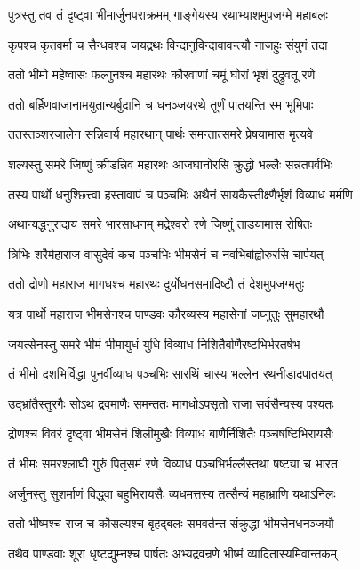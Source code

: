 \twolineshloka
{पुत्रस्तु तव तं दृष्ट्वा भीमार्जुनपराक्रमम्}
{गाङ्गेयस्य रथाभ्याशमुपजग्मे महाबलः}


\twolineshloka
{कृपश्च कृतवर्मा च सैन्धवश्च जयद्रथः}
{विन्दानुविन्दावावन्त्यौ नाजहुः संयुगं तदा}


\twolineshloka
{ततो भीमो महेष्वासः फल्गुनश्च महारथः}
{कौरवाणां चमूं घोरां भृशं दुद्रुवतू रणे}


\twolineshloka
{ततो बर्हिणवाजानामयुतान्यर्बुदानि च}
{धनञ्जयरथे तूर्णं पातयन्ति स्म भूमिपाः}


\twolineshloka
{ततस्तञ्शरजालेन सन्निवार्य महारथान्}
{पार्थः समन्तात्समरे प्रेषयामास मृत्यवे}


\twolineshloka
{शल्यस्तु समरे जिष्णुं क्रीडन्निव महारथः}
{आजघानोरसि क्रुद्धो भल्लैः सन्नतपर्वभिः}


\twolineshloka
{तस्य पार्थो धनुश्छित्त्वा हस्तावापं च पञ्चभिः}
{अथैनं सायकैस्तीक्ष्णैर्भृशं विव्याध मर्मणि}


\twolineshloka
{अथान्यद्धनुरादाय समरे भारसाधनम्}
{मद्रेश्वरो रणे जिष्णुं ताडयामास रोषितः}


\twolineshloka
{त्रिभिः शरैर्महाराज वासुदेवं कच पञ्चभिः}
{भीमसेनं च नवभिर्बाह्वोरुरसि चार्पयत्}


\twolineshloka
{ततो द्रोणो महाराज मागधश्च महारथः}
{दुर्योधनसमादिष्टौ तं देशमुपजग्मतुः}


\twolineshloka
{यत्र पार्थो महाराज भीमसेनश्च पाण्डवः}
{कौरव्यस्य महासेनां जघ्नुतुः सुमहारथौ}


\twolineshloka
{जयत्सेनस्तु समरे भीमं भीमायुधं युधि}
{विव्याध निशितैर्बाणैरष्टभिर्भरतर्षभ}


\twolineshloka
{तं भीमो दशभिर्विद्धा पुनर्वीव्याध पञ्चभिः}
{सारथिं चास्य भल्लेन रथनीडादपातयत्}


\twolineshloka
{उद्भ्रांतैस्तुरगैः सोऽथ द्रवमाणैः समन्ततः}
{मागधोऽपसृतो राजा सर्वसैन्यस्य पश्यतः}


\twolineshloka
{द्रोणश्च विवरं दृष्ट्वा भीमसेनं शिलीमुखैः}
{विव्याध बाणैर्निशितैः पञ्चषष्टिभिरायसैः}


\twolineshloka
{तं भीमः समरश्लाघी गुरुं पितृसमं रणे}
{विव्याध पञ्चभिर्भल्लैस्तथा षष्ट्या च भारत}


\twolineshloka
{अर्जुनस्तु सुशर्माणं विद्ध्वा बहुभिरायसैः}
{व्यधमत्तस्य तत्सैन्यं महाभ्राणि यथाऽनिलः}


\twolineshloka
{ततो भीष्मश्च राज च कौसल्यश्च बृहद्बलः}
{समवर्तन्त संक्रुद्धा भीमसेनधनञ्जयौ}


\twolineshloka
{तथैव पाण्डवाः शूरा धृष्टद्युम्नश्च पार्षतः}
{अभ्यद्रवन्रणे भीष्मं व्यादितास्यमिवान्तकम्}


